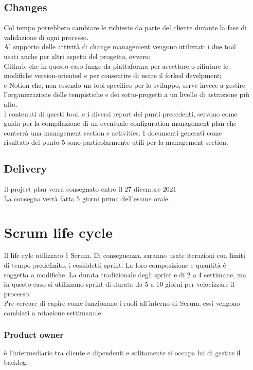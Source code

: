 \documentclass{article}
\begin{document}
\subsection{Changes}
Col tempo potrebbero cambiare le richieste da parte del cliente durante la fase di validazione di ogni processo.
\\Al supporto delle attività di change management vengono utilizzati i due tool usati anche per altri aspetti del progetto, ovvero: 
\\Github, che in questo caso funge da piattaforma per accettare o rifiutare le modifiche version-oriented e per consentire di usare il forked develpment; 
\\e Notion che, non essendo un tool specifico per lo sviluppo, serve invece a gestire l’organizzazione delle tempistiche e dei sotto-progetti a un livello di astrazione più alto.
\\I contenuti di questi tool, e i diversi report dei punti precedenti, servono come guida per la compilazione di un eventuale configuration management plan che conterrà una management section e activities. I documenti generati come risultato del punto 5 sono particolarmente utili per la management section.

\subsection{Delivery}
Il project plan verrà consegnato entro il 27 dicembre 2021
\\La consegna verrà fatta 5 giorni prima dell'esame orale.
\newpage
\section{Scrum life cycle}
Il life cyle utilizzato è Scrum. Di conseguenza, saranno usate iterazioni con limiti di tempo predefinito, i cosiddetti sprint. La loro composizione e quantità è soggetta a modifiche.
La durata tradizionale degli sprint e di 2 a 4 settimane, ma in questo caso si utilizzano sprint di durata da 5 a 10 giorni per velocizzare il processo.
\\Pre cercare di capire come funzionano i ruoli all'interno di Scrum, essi vengono cambiati a rotazione settimanale.

\subsubsection{Product owner} è l'intermediario tra cliente e dipendenti e solitamente si occupa lui di gestire il backlog.
\end{document}
